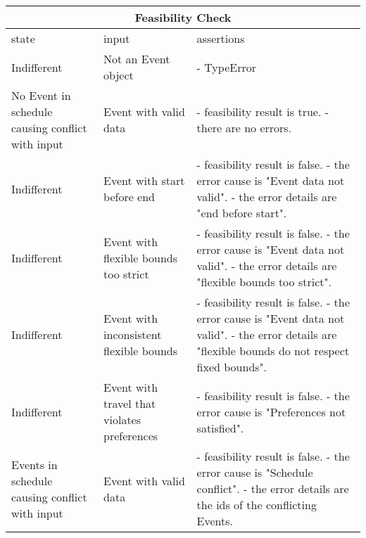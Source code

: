 \begin{center}
	\begin{tabular}{|p{}|p{}|p{}|}
		\hline
		\multicolumn{3}{c}{Feasibility Check}\\
		\hline
		state & input & assertions \\
		\hline
		Indifferent &
		Not an Event object & 
		- TypeError
		\\
		\hline
		No Event in schedule causing conflict with input &
		Event with valid data & 
		- feasibility result is true. \newline
		- there are no errors.
		 \\
		\hline
		Indifferent &
		Event with start before end & 
		- feasibility result is false. \newline
		- the error cause is "Event data not valid". \newline
		- the error details are "end before start".
		 \\
		\hline
		Indifferent &
		Event with flexible bounds too strict & 
		- feasibility result is false. \newline
		- the error cause is "Event data not valid". \newline
		- the error details are "flexible bounds too strict".
		\\
		\hline
		Indifferent &
		Event with inconsistent flexible bounds & 
		- feasibility result is false. \newline
		- the error cause is "Event data not valid". \newline
		- the error details are "flexible bounds do not respect fixed bounds".
		\\
		\hline
		Indifferent &
		Event with travel that violates preferences & 
		- feasibility result is false. \newline
		- the error cause is "Preferences not satisfied".
		\\
		\hline
		Events in schedule causing conflict with input &
		Event with valid data & 
		- feasibility result is false. \newline
		- the error cause is "Schedule conflict". \newline
		- the error details are the ids of the conflicting Events.
		\\
		\hline
	\end{tabular}
\end{center}

